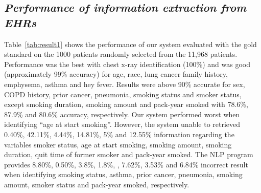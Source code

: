 \documentclass{amia}
\begin{document}
\subsection*{\textit{Performance of information extraction from EHRs}}
Table~\ref{tab:result1} shows the performance of our system evaluated with the gold standard on the 1000 patients randomly selected from the 11,968 patients. Performance was the best with chest x-ray identification (100\%) and was good (approximately 99\% accuracy) for age, race, lung cancer family history, emphysema, asthma and hey fever. Results were above 90\% accurate for sex, COPD history, prior cancer, pneumonia, smoking status and smoker status, except smoking duration, smoking amount and pack-year smoked with 78.6\%, 87.9\% and 80.6\% accuracy, respectively. Our system performed worst when identifying ``age at start smoking''. However, the system unable to retrieved 0.40\%, 42.11\%, 4.44\%, 14.81\%, 5\% and 12.55\% information regarding the variables smoker status, age at start smoking, smoking amount, smoking duration, quit time of former smoker and pack-year smoked. The NLP program provides 8.80\%, 0.50\%, 3.8\%, 1.8\%, , 7.62\%, 3.53\% and 6.84\% incorrect result when identifying  smoking status, asthma, prior cancer, pneumonia, smoking amount, smoker status and pack-year smoked, respectively. \\
\end{document}
